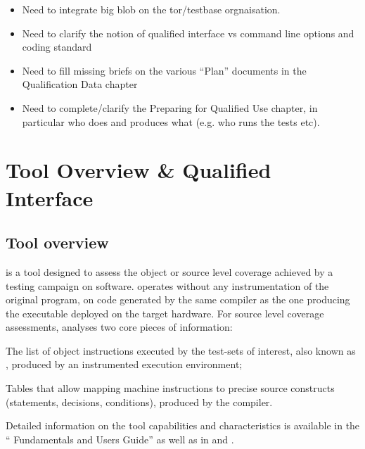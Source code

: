 \documentclass {report}
\begin{document}
\begin{itemize}
\item%
  Need to integrate big blob on the tor/testbase orgnaisation.
%
\item%
  Need to clarify the notion of qualified interface vs command line
  options and coding standard
%
\item%
  Need to fill missing briefs on the various ``Plan'' documents in
  the Qualification Data chapter
%
\item%
  Need to complete/clarify the Preparing for Qualified Use chapter,
  in particular who does and produces what (e.g. who runs the tests etc).
\end{itemize}



\chapter{Tool Overview \& Qualified Interface}


\section{Tool overview}

\xcov{} is a tool designed to assess the object or source level coverage
achieved by a testing campaign on software.
%
\xcov{} operates without any instrumentation of the original program, on
code generated by the same compiler as the one producing the executable
deployed on the target hardware.
%
For source level coverage assessments, \xcov{} analyses two core pieces of
information:

\begin{Itemize}
%
\item The list of object instructions executed by the test-sets of interest,
  also known as , produced by an instrumented execution
  environment;
%
\item Tables that allow mapping machine instructions to precise source
  constructs (statements, decisions, conditions), produced by the compiler.
\end{Itemize}

Detailed information on the tool capabilities and characteristics is available
in the ``\xcov{} Fundamentals and Users Guide'' as well as in \adaeurope and
\erts.
\end{document}

